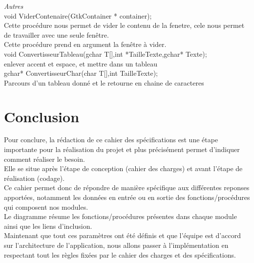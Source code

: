 \documentclass[a4]{article}
\begin{document}
	\textit{Autres}\\
	
	void ViderContenaire(GtkContainer * container);\\
		Cette procédure nous permet de vider le contenu de la fenetre, cele nous permet de travailler avec une seule fenêtre.\\
		Cette procédure prend en argument la fenêtre à vider.\\
	void ConvertisseurTableau(gchar T[],int *TailleTexte,gchar* Texte);\\
		enlever accent et espace, et mettre dans un tableau\\
	 
	gchar* ConvertisseurChar(char T[],int TailleTexte); \\
		Parcours d'un tableau donné et le retourne en chaine de caracteres\\
		
	
	\section{Conclusion}
	
	Pour conclure, la rédaction de ce cahier des spécifications est une étape importante pour la réalisation du projet
	et plus précisément permet d'indiquer comment réaliser le besoin.\\
	
	Elle se situe après l'étape de conception (cahier des charges) et avant l'étape de réalisation (codage).\\
	
	Ce cahier permet donc de répondre de manière spécifique aux différentes reponses apportées, notamment les données en entrée
	ou en sortie des fonctions/procédures qui composent nos modules.\\
	
	Le diagramme résume les fonctions/procédures présentes dans chaque module ainsi que les liens d'inclusion.\\
	
	Maintenant que tout ces paramètres ont été définis et que l'équipe est d'accord sur l'architecture de l'application, nous allons
	passer à l'implémentation en respectant tout les règles fixées par le cahier des charges et des spécifications.
	
	
\end{document}
